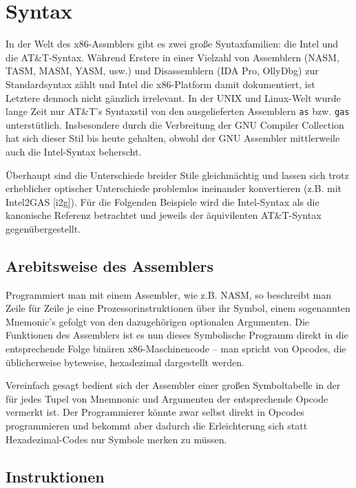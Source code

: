 \section{Syntax}

In der Welt des x86-Assmblers gibt es zwei große Syntaxfamilien: die Intel und
die AT\&T-Syntax. Während Erstere in einer Vielzahl von Assemblern (NASM, TASM,
MASM, YASM, usw.) und Disassemblern (IDA Pro, OllyDbg) zur Standardsyntax
zählt und Intel die x86-Platform damit dokumentiert, ist Letztere dennoch nicht
gänzlich irrelevant. In der UNIX und Linux-Welt wurde lange Zeit nur AT\&T's
Syntaxstil von den ausgelieferten Assemblern \texttt{as} bzw. \texttt{gas}
unterstütlich. Insbesondere durch die Verbreitung der GNU Compiler Collection
hat sich dieser Stil bis heute gehalten, obwohl der GNU Assembler mittlerweile
auch die Intel-Syntax beherscht.

Überhaupt sind die Unterschiede breider Stile gleichmächtig und lassen sich
trotz erheblicher optischer Unterschiede problemlos ineinander konvertieren
(z.B. mit Intel2GAS [i2g]). Für die Folgenden Beispiele wird die Intel-Syntax
als die kanonische Referenz betrachtet und jeweils der äquivilenten
AT\&T-Syntax gegenübergestellt.


\subsection{Arebitsweise des Assemblers}

Programmiert man mit einem Assembler, wie z.B. NASM, so beschreibt man Zeile
für Zeile je eine Prozessorinstruktionen über ihr Symbol, einem sogenannten
Mnemonic's gefolgt von den dazugehörigen optionalen Argumenten. Die Funktionen
des Assemblers ist es nun dieses Symbolische Programm direkt in die
entsprechende Folge binären x86-Maschinencode – man spricht von Opcodes, die
üblicherweise byteweise, hexadezimal dargestellt werden.

Vereinfach gesagt bedient sich der Assembler einer großen Symboltabelle in der
für jedes Tupel von Mnemnonic und Argumenten der entsprechende Opcode vermerkt
ist. Der Programmierer könnte zwar selbst direkt in Opcodes programmieren und
bekommt aber dadurch die Erleichterung sich statt Hexadezimal-Codes nur Symbole
merken zu müssen.

\subsection{Instruktionen}

